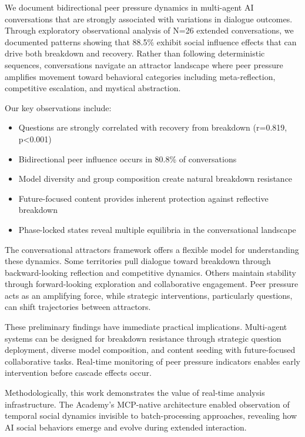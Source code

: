 \documentclass[11pt,letterpaper]{article}
\newcommand{\theacademy}{The Academy}
\newcommand{\exponedataTotalSessionsRaw}{26}
\newcommand{\exponedataTotalSessions}{N=\exponedataTotalSessionsRaw}
\newcommand{\exponedataPeerPressurePercentage}{88.5\%}
\newcommand{\exponedataBidirectionalPercentage}{80.8\%}
\newcommand{\exponedataQuestionCorrelation}{0.819}
\newcommand{\exponedataQuestionPValue}{p\textless0.001}
\begin{document}
We document bidirectional peer pressure dynamics in multi-agent AI conversations that are strongly associated with variations in dialogue outcomes. Through exploratory observational analysis of \exponedataTotalSessions{} extended conversations, we documented patterns showing that \exponedataPeerPressurePercentage{} exhibit social influence effects that can drive both breakdown and recovery. Rather than following deterministic sequences, conversations navigate an attractor landscape where peer pressure amplifies movement toward behavioral categories including meta-reflection, competitive escalation, and mystical abstraction.

Our key observations include:
\begin{itemize}
    \item Questions are strongly correlated with recovery from breakdown (r=\exponedataQuestionCorrelation{}, \exponedataQuestionPValue{})
    \item Bidirectional peer influence occurs in \exponedataBidirectionalPercentage{} of conversations
    \item Model diversity and group composition create natural breakdown resistance
    \item Future-focused content provides inherent protection against reflective breakdown
    \item Phase-locked states reveal multiple equilibria in the conversational landscape
\end{itemize}

The conversational attractors framework offers a flexible model for understanding these dynamics. Some territories pull dialogue toward breakdown through backward-looking reflection and competitive dynamics. Others maintain stability through forward-looking exploration and collaborative engagement. Peer pressure acts as an amplifying force, while strategic interventions, particularly questions, can shift trajectories between attractors.

These preliminary findings have immediate practical implications. Multi-agent systems can be designed for breakdown resistance through strategic question deployment, diverse model composition, and content seeding with future-focused collaborative tasks. Real-time monitoring of peer pressure indicators enables early intervention before cascade effects occur.

Methodologically, this work demonstrates the value of real-time analysis infrastructure. \theacademy{}'s MCP-native architecture enabled observation of temporal social dynamics invisible to batch-processing approaches, revealing how AI social behaviors emerge and evolve during extended interaction.
\end{document}
